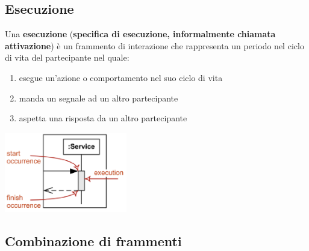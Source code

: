 \documentclass{article}
\begin{document}
\subsection*{Esecuzione}
\large

Una \textbf{esecuzione} (\textbf{specifica di esecuzione, informalmente chiamata attivazione}) è un frammento di interazione che rappresenta un periodo nel ciclo di vita del partecipante nel quale:
\begin{enumerate}
    \renewcommand{\labelenumi}{-}
    \item esegue un'azione o comportamento nel suo ciclo di vita
    \item manda un segnale ad un altro partecipante
    \item aspetta una risposta da un altro partecipante
\end{enumerate}
\begin{center}
    \includegraphics[width=0.4\textwidth]{foto 12.png}\\
\end{center}

\subsection*{Combinazione di frammenti}
\large
\end{document}

